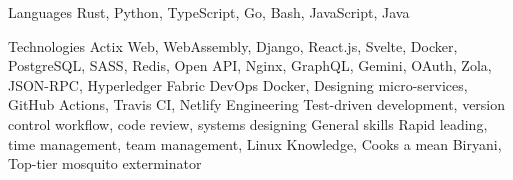 
\begin{cvskills}
  \cvskill
    {Languages} %
    {Rust, Python, TypeScript, Go, Bash, JavaScript, Java} %

  \cvskill
    {Technologies} %
    {Actix Web, WebAssembly, Django, React.js, Svelte, Docker, PostgreSQL, SASS, Redis, Open API, Nginx, GraphQL, Gemini, OAuth, Zola, JSON-RPC, Hyperledger Fabric} %
  \cvskill
    {DevOps}
    {Docker, Designing micro-services, GitHub Actions, Travis CI, Netlify}
  \cvskill
    {Engineering}
    {Test-driven development, version control workflow, code review, systems designing}
  \cvskill
    {General skills}
    {Rapid leading, time management, team management, Linux Knowledge, Cooks a mean Biryani, Top-tier mosquito exterminator}
\end{cvskills}
